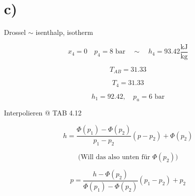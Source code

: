 

\section*{c)}

Drossel $\sim$ isenthalp, isotherm

\[
x_4 = 0 \quad p_4 = 8 \text{ bar} \quad \sim \quad h_4 = 93.42 \frac{\text{kJ}}{\text{kg}}
\]

\[
T_{AB} = 31.33
\]

\[
T_4 = 31.33
\]

\[
h_1 = 92.42, \quad p_u = 6 \text{ bar}
\]

Interpolieren @ TAB 4.12

\[
h = \frac{\Phi(p_1) - \Phi(p_2)}{p_1 - p_2} \left( p - p_2 \right) + \Phi(p_2)
\]

\[
\text{(Will das also unten für } \Phi(p_2) \text{)}
\]

\[
p = \frac{h - \Phi(p_2)}{\Phi(p_1) - \Phi(p_2)} (p_1 - p_2) + p_2
\]